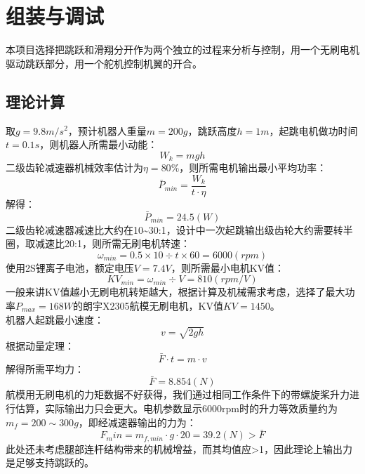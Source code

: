 
\chapter{组装与调试}
\label{cha:chapter03}
本项目选择把跳跃和滑翔分开作为两个独立的过程来分析与控制，用一个无刷电机驱动跳跃部分，用一个舵机控制机翼的开合。
\section{理论计算}
\label{sec:calculations}
取$g=9.8m/s^2$，预计机器人重量$m=200g$，跳跃高度$h=1m$，起跳电机做功时间$t=0.1s$，则机器人所需最小动能：
\begin{equation}
\label{equ:chap2:W_calc}
W_k=mgh
\end{equation}
二级齿轮减速器机械效率估计为$\eta=80\%$，则所需电机输出最小平均功率：
\begin{equation}
  \label{equ:chap2:P_calc}
  \bar{P}_{min}=\frac{W_k}{t·\eta}
  \end{equation}
解得：$$\bar{P}_{min}=24.5(W)$$
二级齿轮减速器减速比大约在10\sim30:1，设计中一次起跳输出级齿轮大约需要转半圈，取减速比20:1，则所需无刷电机转速：
$$\omega_{min}=0.5\times10\div t\times60=6000(rpm)$$
使用2S锂离子电池，额定电压$V=7.4V$，则所需最小电机KV值：
$$KV_{min}=\omega_{min}\div V=810(rpm/V)$$
一般来讲KV值越小无刷电机转矩越大，根据计算及机械需求考虑，选择了最大功率$P_{max}=168W$的朗宇X2305航模无刷电机，KV值$KV=1450$。\\
机器人起跳最小速度：
\begin{equation}
  \label{equ:chap2:v_calc}
  v=\sqrt{2gh}
  \end{equation}
根据动量定理：
\begin{equation}
  \label{equ:chap2:motion_principle}
  \bar{F}·t=m·v
  \end{equation}
解得所需平均力：$$\bar{F}=8.854(N)$$
航模用无刷电机的力矩数据不好获得，我们通过相同工作条件下的带螺旋桨升力进行估算，实际输出力只会更大。电机参数显示6000rpm时的升力等效质量约为$m_f=200\sim300g$，即经减速器输出的力为：$$F_min=m_{f,min}·g·20=39.2(N)>\bar{F}$$
此处还未考虑腿部连杆结构带来的机械增益，而其均值应>1，因此理论上输出力是足够支持跳跃的。
